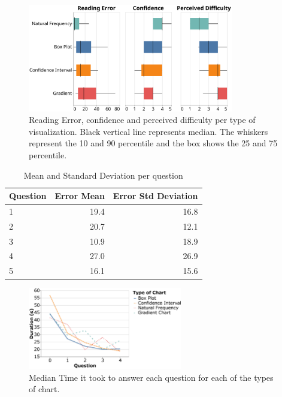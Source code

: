 \documentclass[a4paper,3p,sort&compress]{elsarticle}
\begin{document}
\begin{figure}
  \centering
  \includegraphics[width=0.8\textwidth]{comparison}
  \caption{\label{figure:errors}Reading Error, confidence and perceived difficulty per 
  type of visualization. Black vertical line represents median.
  The whiskers represent the 10 and 90 percentile and the box shows the 25 and 
  75 percentile.}
\end{figure}


\begin{table}[h!]
  \centering
  \begin{tabular}{lrr}
    \toprule
    {}Question &     Error Mean &        Error Std Deviation \\
    \midrule
    1 &  19.4 &  16.8 \\
    2 &  20.7 &  12.1 \\
    3 &  10.9 &  18.9 \\
    4 &  27.0 &  26.9 \\
    5 &  16.1 &  15.6 \\
    \bottomrule
    \end{tabular}
  \caption{Mean and Standard Deviation per question}
  \label{table:resultsperquestion}
  \end{table}

\begin{figure}
  \centering
   \includegraphics[width=0.6\textwidth]{duration_evo2}
  \caption{\label{figure:duration} Median Time it took to answer each question for each of the types of chart.}
\end{figure}  
\end{document}
